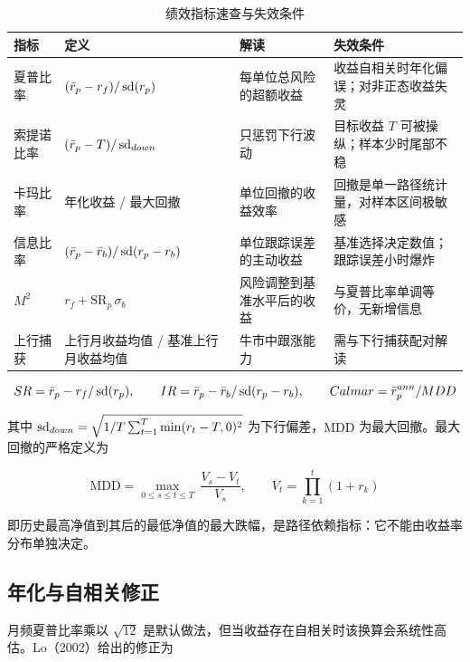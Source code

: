 \begin{table}[htbp]
\centering
\caption{绩效指标速查与失效条件}\label{tab:11-perf}
\tablefont
\begin{tabularx}{\textwidth}{@{}L{2.4cm}L{4.0cm}YL{3.0cm}@{}}
\toprule
指标 & 定义 & 解读 & 失效条件 \\
\midrule
夏普比率 & $(\bar r_p - r_f)/\operatorname{sd}(r_p)$ & 每单位总风险的超额收益 & 收益自相关时年化偏误；对非正态收益失灵 \\
索提诺比率 & $(\bar r_p - T)/\operatorname{sd}_{down}$ & 只惩罚下行波动 & 目标收益 $T$ 可被操纵；样本少时尾部不稳 \\
卡玛比率 & 年化收益 / 最大回撤 & 单位回撤的收益效率 & 回撤是单一路径统计量，对样本区间极敏感 \\
信息比率 & $(\bar r_p - \bar r_b)/\operatorname{sd}(r_p - r_b)$ & 单位跟踪误差的主动收益 & 基准选择决定数值；跟踪误差小时爆炸 \\
$M^{2}$ & $r_f + \text{SR}_p\,\sigma_b$ & 风险调整到基准水平后的收益 & 与夏普比率单调等价，无新增信息 \\
上行捕获 & 上行月收益均值 / 基准上行月收益均值 & 牛市中跟涨能力 & 需与下行捕获配对解读 \\
\bottomrule
\end{tabularx}
\end{table}

\begin{equation}\label{eq:11-sharpe}
  SR = \bar r_p - r_f/\operatorname{sd}(r_p),\qquad
  IR = \bar r_p - \bar r_b/\operatorname{sd}(r_p - r_b),\qquad
  Calmar = \bar r_p^{ann}/MDD
\end{equation}

其中 $\operatorname{sd}_{down} = \sqrt{1/T\sum_{t=1}^{T}\min(r_t - T,0)^{2}}$ 为下行偏差，$\text{MDD}$ 为最大回撤。最大回撤的严格定义为

\begin{equation}\label{eq:11-mdd}
  \text{MDD} = \max_{0\le s\le t\le T}\ \frac{V_s - V_t}{V_s},
  \qquad V_t = \prod_{k=1}^{t}\left(1 + r_k\right)
\end{equation}

即历史最高净值到其后的最低净值的最大跌幅，是路径依赖指标：它不能由收益率分布单独决定。

\subsection{年化与自相关修正}

月频夏普比率乘以 $\sqrt{12}$ 是默认做法，但当收益存在自相关时该换算会系统性高估。Lo（2002）给出的修正为


